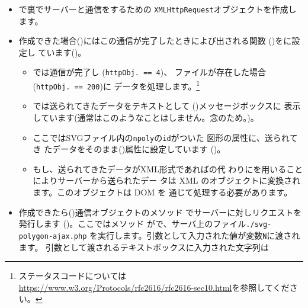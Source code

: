 
\begin{itemize}
 \item {}で裏でサーバーと通信をするための
       \texttt{XMLHttpRequest}オブジェクトを作成します。
  \item 作成できた場合()にはこの通信が完了したときによび出される関数
	()をに設定し
        ています()。
 \begin{itemize}
  \item {}では通信が完了し
        (\texttt{httpObj.}\texttt{ ==	4})、
        ファイルが存在した場合\\
        (\texttt{httpObj.}\texttt{ == 200})に
	データを処理します。\footnote{ステータスコードについては
        \href{https://www.w3.org/Protocols/rfc2616/rfc2616-sec10.html}
        {https://www.w3.org/Protocols/rfc2616/rfc2616-sec10.html}を参照してください。}
  \item {}では送られてきたデータをテキストとして
	()メッセージボックスに
	表示しています(通常はこのようなことはしません。念のため。)。
  \item ここではSVGファイル内の\texttt{npoly}の\texttt{id}がついた
        図形の属性に、送られてき
	たデータをそのまま()属性に設定しています
        ()。
  \item もし、送られてきたデータがXML形式であればの代
	わりにを用いることによりサーバーから送られたデー
	タは XML のオブジェクトに変換されます。このオブジェクトは DOM を
	通じて処理する必要があります。
 \end{itemize}
 \iffalse
       {このプログラムではブラウザの名称やバージョンを用いて作成するオブジェ
       クトを変えていないことに注意してください。オブジェクトが存在する
       かどうかを調べて、存在しない場合には別の方法をとるというのが最近
       の手法です。いろいろなライブラリーではこの手続きを隠すようにして
       います。}
       \fi
 \item 作成できたら()通信オブジェクトのメソッド
       でサーバーに対しリクエストを発行します
       ()。ここではメソッド
       がで、サーバ上のファイル\texttt{./svg-polygon-ajax.php}
       を実行します。引数として入力された値が変数\texttt{N}に渡されます。
       引数として渡されるテキストボックスに入力された文字列は

\end{itemize}
